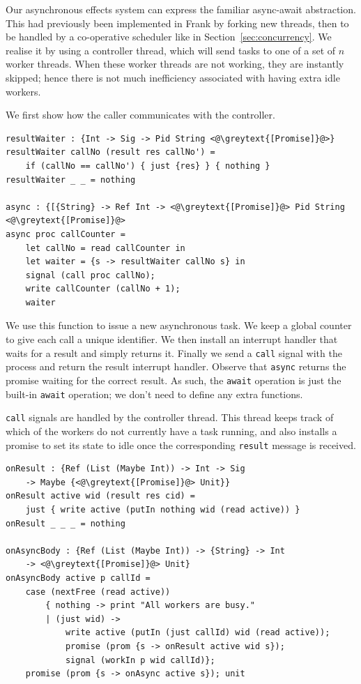 \documentclass[msc,deptreport,cs]{infthesis} %
\newcommand{\code}[1]{\lstinline{#1}}
\newcommand{\greytext}[1]{\textcolor{black!40}{#1}}
\begin{document}
Our asynchronous effects system can express the familiar async-await
abstraction. This had previously been implemented in Frank by forking new
threads, then to be handled by a co-operative scheduler like in
Section~\ref{sec:concurrency}. We realise it by using a controller thread, which
will send tasks to one of a set of $n$ worker threads. When these worker threads
are not working, they are instantly skipped; hence there is not much
inefficiency associated with having extra idle workers.

We first show how the caller communicates with the controller.

\begin{lstlisting}
resultWaiter : {Int -> Sig -> Pid String <@\greytext{[Promise]}@>}
resultWaiter callNo (result res callNo') =
    if (callNo == callNo') { just {res} } { nothing }
resultWaiter _ _ = nothing

async : {[{String} -> Ref Int -> <@\greytext{[Promise]}@> Pid String <@\greytext{[Promise]}@>
async proc callCounter =
    let callNo = read callCounter in
    let waiter = {s -> resultWaiter callNo s} in
    signal (call proc callNo);
    write callCounter (callNo + 1);
    waiter
\end{lstlisting}

We use this function to issue a new asynchronous task. We keep a global counter
to give each call a unique identifier. We then install an interrupt handler that
waits for a result and simply returns it. Finally we send a \code{call} signal
with the process and return the result interrupt handler. Observe that
\code{async} returns the promise waiting for the correct result. As such, the
\code{await} operation is just the built-in \code{await} operation; we don't
need to define any extra functions.

\code{call} signals are handled by the controller thread. This thread keeps
track of which of the workers do not currently have a task running, and
also installs a promise to set its state to idle once the corresponding
\code{result} message is received.

\begin{lstlisting}
onResult : {Ref (List (Maybe Int)) -> Int -> Sig
    -> Maybe {<@\greytext{[Promise]}@> Unit}}
onResult active wid (result res cid) =
    just { write active (putIn nothing wid (read active)) }
onResult _ _ _ = nothing

onAsyncBody : {Ref (List (Maybe Int)) -> {String} -> Int
    -> <@\greytext{[Promise]}@> Unit}
onAsyncBody active p callId =
    case (nextFree (read active))
        { nothing -> print "All workers are busy."
        | (just wid) ->
            write active (putIn (just callId) wid (read active));
            promise (prom {s -> onResult active wid s});
            signal (workIn p wid callId)};
    promise (prom {s -> onAsync active s}); unit
\end{lstlisting}
\end{document}
